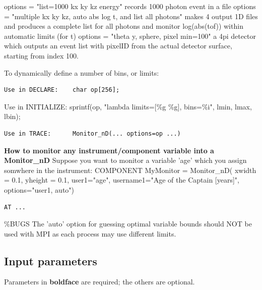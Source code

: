 options = "list=1000 kx ky kz energy" records 1000 photon event in a file options = "multiple kx ky kz, auto abs log t, and list all photons" makes 4 output 1D files and produces a complete list for all photons and monitor log(abs(tof)) within automatic limits (for t) options = "theta y, sphere, pixel min=100" a 4pi detector which outputs an event list with pixelID from the actual detector surface, starting from index 100.

To dynamically define a number of bins, or limits:

\begin{verbatim}
Use in DECLARE:    char op[256];
\end{verbatim}

Use in INITIALIZE: sprintf(op, "lambda limits=[\%g \%g], bins=\%i", lmin, lmax, lbin);

\begin{verbatim}
Use in TRACE:      Monitor_nD(... options=op ...)
\end{verbatim}

\textbf{How to monitor any instrument/component variable into a Monitor\_nD} Suppose you want to monitor a variable 'age' which you assign somwhere in the instrument: COMPONENT MyMonitor = Monitor\_nD( xwidth = 0.1, yheight = 0.1, user1="age", username1="Age of the Captain [years]", options="user1, auto")

\begin{verbatim}
AT ...
\end{verbatim}

\%BUGS The 'auto' option for guessing optimal variable bounds should NOT be used with MPI as each process may use different limits.

\subsection*{Input parameters}
Parameters in \textbf{boldface} are required; the others are optional.

